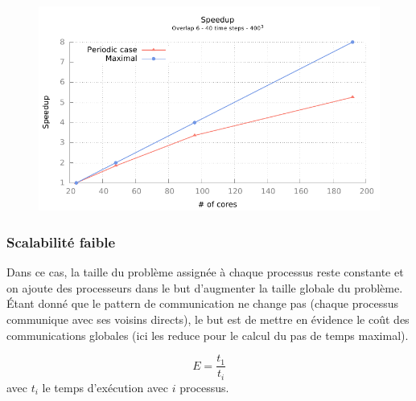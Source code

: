 \begin{figure}[ht]
  \centering
  \includegraphics[scale=1.0]{gnuplot/bench_strong_nemo.pdf}
  \caption{\label{fig:strong-nemo} }
\end{figure}





\subsubsection{Scalabilité faible}\label{sec:scal-weak}
Dans ce cas, la taille du problème assignée à chaque processus reste constante et on ajoute des processeurs dans le but d'augmenter la taille globale du problème. Étant donné que le pattern de communication ne change pas (chaque processus communique avec ses voisins directs), le but est de mettre en évidence le coût des communications globales (ici les reduce pour le calcul du pas de temps maximal).


$$E=\frac{t_1}{t_i}$$ avec $t_i$ le temps d'exécution avec $i$ processus.





